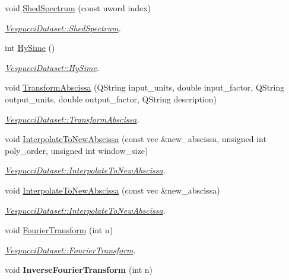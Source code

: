 \begin{DoxyCompactItemize}
\item 
void \hyperlink{class_vespucci_dataset_a3d199a68c6dfa8f609ed7eacdb3d1ec8}{Shed\+Spectrum} (const uword index)
\begin{DoxyCompactList}\small\item\em \hyperlink{class_vespucci_dataset_a3d199a68c6dfa8f609ed7eacdb3d1ec8}{Vespucci\+Dataset\+::\+Shed\+Spectrum}. \end{DoxyCompactList}\item 
int \hyperlink{class_vespucci_dataset_a7c685d41d2093602e563f7facaff7f9a}{Hy\+Sime} ()
\begin{DoxyCompactList}\small\item\em \hyperlink{class_vespucci_dataset_a7c685d41d2093602e563f7facaff7f9a}{Vespucci\+Dataset\+::\+Hy\+Sime}. \end{DoxyCompactList}\item 
void \hyperlink{class_vespucci_dataset_a62c4edb7f9b74d6b0eb1fa993b98cee0}{Transform\+Abscissa} (Q\+String input\+\_\+units, double input\+\_\+factor, Q\+String output\+\_\+units, double output\+\_\+factor, Q\+String description)
\begin{DoxyCompactList}\small\item\em \hyperlink{class_vespucci_dataset_a62c4edb7f9b74d6b0eb1fa993b98cee0}{Vespucci\+Dataset\+::\+Transform\+Abscissa}. \end{DoxyCompactList}\item 
void \hyperlink{class_vespucci_dataset_a23be21ea51f7b2f2a5ec7c3935154403}{Interpolate\+To\+New\+Abscissa} (const vec \&new\+\_\+abscissa, unsigned int poly\+\_\+order, unsigned int window\+\_\+size)
\begin{DoxyCompactList}\small\item\em \hyperlink{class_vespucci_dataset_a23be21ea51f7b2f2a5ec7c3935154403}{Vespucci\+Dataset\+::\+Interpolate\+To\+New\+Abscissa}. \end{DoxyCompactList}\item 
void \hyperlink{class_vespucci_dataset_ab84cb1d6fd511e3ea93d0ecad3fc5c24}{Interpolate\+To\+New\+Abscissa} (const vec \&new\+\_\+abscissa)
\begin{DoxyCompactList}\small\item\em \hyperlink{class_vespucci_dataset_a23be21ea51f7b2f2a5ec7c3935154403}{Vespucci\+Dataset\+::\+Interpolate\+To\+New\+Abscissa}. \end{DoxyCompactList}\item 
void \hyperlink{class_vespucci_dataset_ae212291760f6c840c4c6dde669d10a52}{Fourier\+Transform} (int n)
\begin{DoxyCompactList}\small\item\em \hyperlink{class_vespucci_dataset_ae212291760f6c840c4c6dde669d10a52}{Vespucci\+Dataset\+::\+Fourier\+Transform}. \end{DoxyCompactList}\item 
void {\bfseries Inverse\+Fourier\+Transform} (int n)\hypertarget{class_vespucci_dataset_a9901e36295b8da38f40e891bf8296cb9}{}\label{class_vespucci_dataset_a9901e36295b8da38f40e891bf8296cb9}


\end{DoxyCompactItemize}
